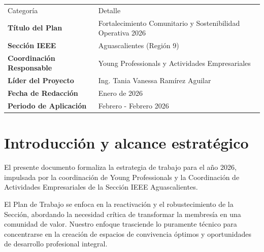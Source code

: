 \documentclass[11pt,a4paper]{article}
\begin{document}
\vspace{0.5cm}


\vspace{0.8cm}


\begin{center}
\begin{tabular}{@{}p{4.5cm} p{8cm}@{}}
    \small Categoría & \small Detalle \\[0.5cm]
    
    \textbf{Título del Plan} & Fortalecimiento Comunitario y Sostenibilidad Operativa 2026 \\[0.5cm]
    
    \textbf{Sección IEEE} & Aguascalientes (Región 9) \\[0.5cm]
    
    \textbf{Coordinación Responsable} & Young Professionals y Actividades Empresariales \\[0.5cm]
    
    \textbf{Líder del Proyecto} & Ing. Tania Vanessa Ramírez Aguilar \\[0.5cm]
    
    \textbf{Fecha de Redacción} & Enero de 2026 \\[0.5cm]
    
    \textbf{Periodo de Aplicación} & Febrero - Febrero 2026 \\[0.5cm]
\end{tabular}
\end{center}


\pagestyle{fancy}
\fancyhf{}
\renewcommand{\headrulewidth}{0pt}
\fancyfoot[C]{\thepage}

\vspace{0.5cm}

\section{Introducción y alcance estratégico}
El presente documento formaliza la estrategia de trabajo para el año 2026, impulsada por la coordinación de Young Professionals y la Coordinación de Actividades Empresariales de la Sección IEEE Aguascalientes.

El Plan de Trabajo se enfoca en la reactivación y el robustecimiento de la Sección, abordando la necesidad crítica de transformar la membresía en una comunidad de valor. Nuestro enfoque trasciende lo puramente técnico para concentrarse en la creación de espacios de convivencia óptimos y oportunidades de desarrollo profesional integral.
\end{document}
